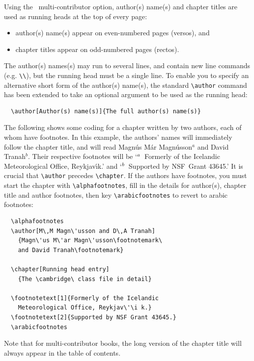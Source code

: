 Using the \cambridge\ multi-contributor option, author(s) name(s) and chapter titles are used as running heads at the top of every page:
\begin{itemize}
\item author(s) name(s) appear on even-numbered pages (versos), and
\item chapter titles appear on odd-numbered pages (rectos).
\end{itemize}
The author(s) names(s) may run to several lines, and contain new line commands (e.g. \verb"\\"), but the running head must be a single line. To enable you to specify an alternative short form of the author(s) name(s), the standard \verb"\author" command has been extended to take an optional argument to be used as the running head:
\begin{verbatim}
  \author[Author(s) name(s)]{The full author(s) name(s)}
\end{verbatim}
The following shows some coding for a chapter written by two authors, each of whom have footnotes. In this example, the authors' names will immediately follow the chapter title, and will read Magn\'us M\'ar Magn\'usson$^{a}$ and David Tranah$^{b}$. Their respective footnotes will be `$^{a}\enskip$Formerly of the Icelandic Meteorological Office, Reykjav\'\i k.' and `$^{b}\enskip$Supported by NSF~Grant 43645.' It is crucial that \verb"\author" precedes \verb"\chapter". If the authors have footnotes, you must start the chapter with \verb"\alphafootnotes", fill in the details for author(s), chapter title and author footnotes, then key \verb"\arabicfootnotes" to revert to arabic footnotes:
\begin{verbatim}
  \alphafootnotes
  \author[M\,M Magn\'usson and D\,A Tranah]
    {Magn\'us M\'ar Magn\'usson\footnotemark\
    and David Tranah\footnotemark}

  \chapter[Running head entry]
    {The \cambridge\ class file in detail}

  \footnotetext[1]{Formerly of the Icelandic
    Meteorological Office, Reykjav\'\i k.}
  \footnotetext[2]{Supported by NSF Grant 43645.}
  \arabicfootnotes
\end{verbatim}
Note that for multi-contributor books, the long version of the chapter title will always appear in the table of contents.


